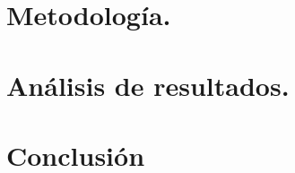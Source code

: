 \documentclass[a4paper, 12pt]{article}
\begin{document}
    \section{Metodología.}

    \section{Análisis de resultados.}

    \section{Conclusión}
    \printbibliography
\end{document}
